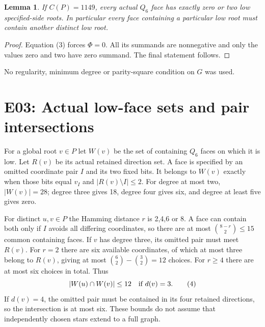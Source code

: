 \documentclass{article}
\newtheorem{lemma}{Lemma}
\begin{document}
\begin{lemma}
If $C(P)=1149$, every actual $Q_6$ face has exactly zero or two low
specified-side roots. In particular every face containing a particular
low root must contain another distinct low root.
\end{lemma}
\begin{proof}
Equation (3) forces $\Phi=0$. All its summands are nonnegative and only
the values zero and two have zero summand. The final statement follows.
\end{proof}
No regularity, minimum degree or parity-square condition on $G$ was used.

\section{E03: Actual low-face sets and pair intersections}
For a global root $v\in P$ let $W(v)$ be the set of containing $Q_6$
faces on which it is low. Let $R(v)$ be its actual retained direction set.
A face is specified by an omitted coordinate pair $I$ and its two fixed
bits. It belongs to $W(v)$ exactly when those bits equal $v_I$ and
$|R(v)\setminus I|\le2$.
For degree at most two, $|W(v)|=28$; degree three gives 18, degree four
gives six, and degree at least five gives zero.

For distinct $u,v\in P$ the Hamming distance $r$ is 2,4,6 or 8.
A face can contain both only if $I$ avoids all differing coordinates,
so there are at most $\binom{8-r}{2}\le15$ common containing faces.
If $v$ has degree three, its omitted pair must meet $R(v)$. For $r=2$
there are six available coordinates, of which at most three belong to
$R(v)$, giving at most $\binom62-\binom32=12$ choices. For $r\ge4$
there are at most six choices in total. Thus
\[
 |W(u)\cap W(v)|\le12\quad\hbox{if }d(v)=3.                 \tag{4}
\]
If $d(v)=4$, the omitted pair must be contained in its four retained
directions, so the intersection is at most six. These bounds do not
assume that independently chosen stars extend to a full graph.
\end{document}
